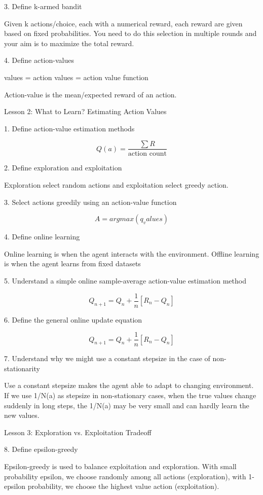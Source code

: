 \documentclass[sutton_barto_notes.tex]{subfiles}
\begin{document}
3. Define k-armed bandit

Given k actions/choice, each with a numerical reward, each reward are given based on fixed probabilities. You need to do this selection in multiple rounds and your aim is to maximize the total reward.

4. Define action-values

values = action values = action value function

Action-value is the mean/expected reward of an action.


Lesson 2: What to Learn? Estimating Action Values

1. Define action-value estimation methods

$$Q(a) = \frac{\sum R}{\text{action count}}$$

2. Define exploration and exploitation

Exploration select random actions and exploitation select greedy action.

3. Select actions greedily using an action-value function

$$A = argmax(q_values)$$

4. Define online learning

Online learning is when the agent interacts with the environment.
Offline learning is when the agent learns from fixed datasets

5. Understand a simple online sample-average action-value estimation method

$$Q_{n+1} = Q_n + \frac{1}{n}[R_n - Q_n]$$

6. Define the general online update equation

$$Q_{n+1} = Q_n + \frac{1}{n}[R_n - Q_n]$$

7. Understand why we might use a constant stepsize in the case of non-stationarity

Use a constant stepsize makes the agent able to adapt to changing environment.
If we use 1/N(a) as stepsize in non-stationary cases, when the true values change suddenly in long steps, the 1/N(a) may be very small and can hardly learn the new values.

Lesson 3: Exploration vs. Exploitation Tradeoff

8. Define epsilon-greedy

Epsilon-greedy is used to balance exploitation and exploration. With small probability epsilon, we choose randomly among all actions (exploration), with 1-epsilon probability, we choose the highest value action (exploitation).
\end{document}
